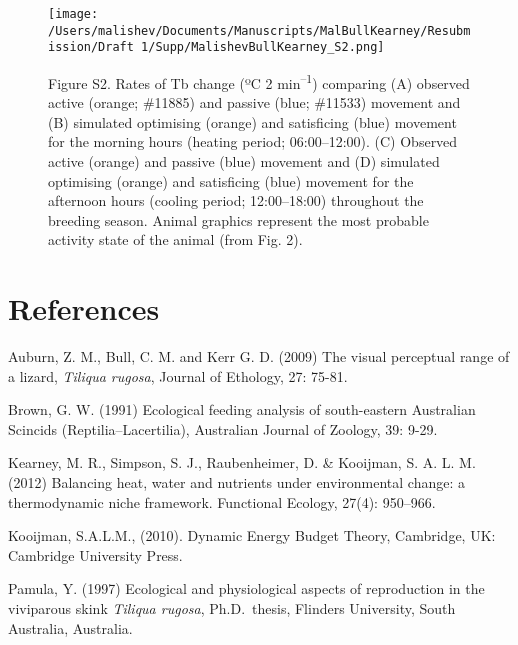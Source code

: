\documentclass[]{article}
\let\oldsubparagraph\subparagraph
\renewcommand{\subparagraph}[1]{\oldsubparagraph{#1}\mbox{}}
\begin{document}
\begin{figure}
\centering
\texttt{[image: /Users/malishev/Documents/Manuscripts/MalBullKearney/Resubmission/Draft 1/Supp/MalishevBullKearney\_S2.png]}
\caption{Figure S2. Rates of Tb change (ºC 2 min\textsuperscript{--1})
comparing (A) observed active (orange; \#11885) and passive (blue;
\#11533) movement and (B) simulated optimising (orange) and satisficing
(blue) movement for the morning hours (heating period; 06:00--12:00).
(C) Observed active (orange) and passive (blue) movement and (D)
simulated optimising (orange) and satisficing (blue) movement for the
afternoon hours (cooling period; 12:00--18:00) throughout the breeding
season. Animal graphics represent the most probable activity state of
the animal (from Fig. 2).}
\end{figure}

\subparagraph{}\label{section-8}

\section{References}\label{references}

Auburn, Z. M., Bull, C. M. and Kerr G. D. (2009) The visual perceptual
range of a lizard, \emph{Tiliqua rugosa}, Journal of Ethology, 27:
75-81.

Brown, G. W. (1991) Ecological feeding analysis of south-eastern
Australian Scincids (Reptilia--Lacertilia), Australian Journal of
Zoology, 39: 9-29.

Kearney, M. R., Simpson, S. J., Raubenheimer, D. \& Kooijman, S. A. L.
M. (2012) Balancing heat, water and nutrients under environmental
change: a thermodynamic niche framework. Functional Ecology, 27(4):
950--966.

Kooijman, S.A.L.M., (2010). Dynamic Energy Budget Theory, Cambridge, UK:
Cambridge University Press.

Pamula, Y. (1997) Ecological and physiological aspects of reproduction
in the viviparous skink \emph{Tiliqua rugosa}, Ph.D.~thesis, Flinders
University, South Australia, Australia.
\end{document}
